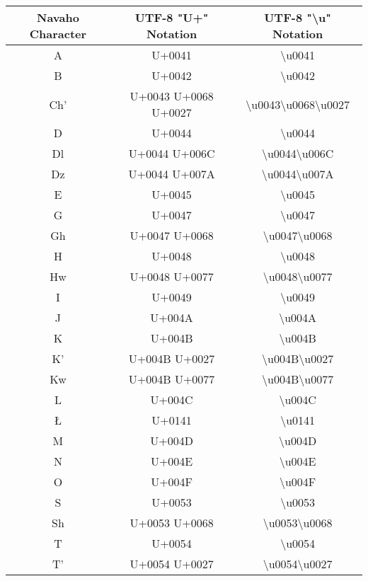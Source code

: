 \begin{longtable}{|c|c|c|}
\hline
Navaho Character & UTF-8 "U+" Notation & UTF-8 "\textbackslash{u}" Notation \\
\hline
A & U+0041 & \textbackslash{}u0041 \\ \hline
B & U+0042 & \textbackslash{}u0042 \\ \hline
Ch' & U+0043 U+0068 U+0027 & \textbackslash{}u0043\textbackslash{}u0068\textbackslash{}u0027 \\ \hline
D & U+0044 & \textbackslash{}u0044 \\ \hline
Dl & U+0044 U+006C & \textbackslash{}u0044\textbackslash{}u006C \\ \hline
Dz & U+0044 U+007A & \textbackslash{}u0044\textbackslash{}u007A \\ \hline
E & U+0045 & \textbackslash{}u0045 \\ \hline
G & U+0047 & \textbackslash{}u0047 \\ \hline
Gh & U+0047 U+0068 & \textbackslash{}u0047\textbackslash{}u0068 \\ \hline
H & U+0048 & \textbackslash{}u0048 \\ \hline
Hw & U+0048 U+0077 & \textbackslash{}u0048\textbackslash{}u0077 \\ \hline
I & U+0049 & \textbackslash{}u0049 \\ \hline
J & U+004A & \textbackslash{}u004A \\ \hline
K & U+004B & \textbackslash{}u004B \\ \hline
K' & U+004B U+0027 & \textbackslash{}u004B\textbackslash{}u0027 \\ \hline
Kw & U+004B U+0077 & \textbackslash{}u004B\textbackslash{}u0077 \\ \hline
L & U+004C & \textbackslash{}u004C \\ \hline
Ł & U+0141 & \textbackslash{}u0141 \\ \hline
M & U+004D & \textbackslash{}u004D \\ \hline
N & U+004E & \textbackslash{}u004E \\ \hline
O & U+004F & \textbackslash{}u004F \\ \hline
S & U+0053 & \textbackslash{}u0053 \\ \hline
Sh & U+0053 U+0068 & \textbackslash{}u0053\textbackslash{}u0068 \\ \hline
T & U+0054 & \textbackslash{}u0054 \\ \hline
T' & U+0054 U+0027 & \textbackslash{}u0054\textbackslash{}u0027 \\ \hline

\end{longtable}
